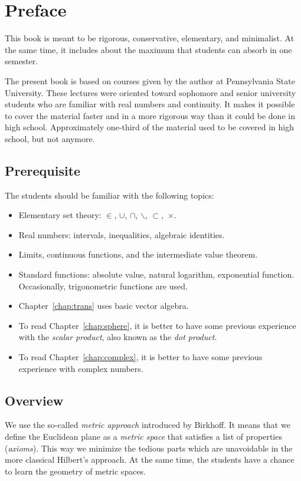 \chapter*{Preface}

This book is meant to be 
rigorous, 
conservative, 
elementary, 
and minimalist.
At the same time, it includes about the maximum that students can absorb in one semester.

The present book is based 
on courses given by the author 
at Pennsylvania State University.
These lectures were oriented toward sophomore and senior university students who are familiar with real numbers and continuity.
It makes it possible to cover the material faster 
and  in a more rigorous way
than it could be done in high school.
Approximately one-third of the material used to be covered in high school, but not anymore.

\section{Prerequisite}


The students should be familiar 
with the following topics:
\begin{itemize}
\item Elementary set theory: 
$\in$,
$\cup$, 
$\cap$,
$\backslash$,
$\subset$,~$\times$.
\item Real numbers: intervals, inequalities, algebraic identities.
\item Limits, continuous functions, and the intermediate value theorem.
\item Standard functions: 
absolute value, 
natural logarithm,
exponential function. 
Occasionally, trigonometric functions  are used.
\item  Chapter~\ref{chap:trans} uses basic vector algebra.
\item To read Chapter~\ref{chap:sphere}, it is better to have some previous experience with the \textit{scalar product}, also known as the \textit{dot product}.
\item To read Chapter~\ref{chap:complex}, it is better to have some previous experience with complex numbers.
\end{itemize} 

\section{Overview}

We use the so-called \textit{metric approach} introduced by Birkhoff.
It means that we define the Euclidean plane as a \textit{metric space} that satisfies a list of properties (\textit{axioms}).
This way we minimize the tedious parts
which are unavoidable in the more classical Hilbert's approach.
At the same time, the students have a chance to learn the geometry of metric spaces.

